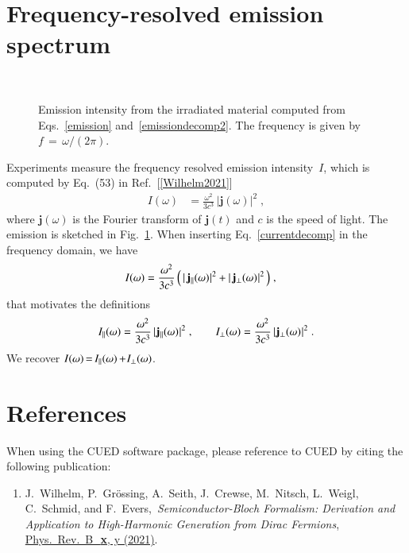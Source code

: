 \documentclass[11pt, a4paper]{scrartcl}
\newlength\figureheight
\newlength\figurewidth
\newcommand{\paper}[4]{\item #1, \,\textit{#2}, \,\href{#3}{#4}.\\[-1.4em]}
\newcommand{\bj}{\mathbf{j}}
\newcommand{\sd}{\hspace{0.05em}}
\newcommand{\eqt}{\,{=}\,}
\begin{document}
\section{Frequency-resolved emission spectrum}
\begin{figure}[b!]
\centering
\setlength\figureheight{9cm} 
\setlength{}

\\[1.5em]

\caption{Emission intensity from the irradiated material computed from Eqs.~\eqref{emission} and~\eqref{emissiondecomp2}.
%
The frequency is given by $f\eqt\omega/(2\pi)$.
}
    \label{fig:emission}
\end{figure}
Experiments measure the  frequency resolved emission intensity~$I$, which is computed by Eq.~(53) in Ref.~[\ref{Wilhelm2021}]
\begin{align}
I(\omega) &=
\frac{\omega^2}{3c^3}\,|\bj(\omega)|^2\;, \label{emission}
\end{align}
where $\bj(\omega)$ is the Fourier transform of $\bj(t)$ and $c$ is the speed of light. 
%
The emission is sketched in Fig.~\ref{fig:emission}.
%
When inserting Eq.~\eqref{currentdecomp} in the frequency domain, we have
\begin{align}
I(\omega) &=
\frac{\omega^2}{3c^3}\,\Big(\,|\,\bj_\parallel(\omega)\sd|^2
+ |\,\bj_\bot(\omega)\sd|^2 \,\Big)
\;, \label{emissiondecomp}
\end{align}
that motivates the definitions
\begin{align}
I_\parallel(\omega) =
\frac{\omega^2}{3c^3}\, |\sd\bj_\parallel(\omega)\sd|^2\;,
\hspace{2em}
I_\bot(\omega) =
\frac{\omega^2}{3c^3}\, |\sd\bj_\bot(\omega)\sd|^2\;. \label{emissiondecomp2}
\end{align}
We recover $I(\omega)\eqt I_\parallel(\omega)\,{+}\sd I_\bot(\omega)$.




\section{References}
When using the CUED software package, please reference to CUED by citing the following publication:
\begin{enumerate}[leftmargin=*]

\paper{J.~Wilhelm, P.~Grössing, A.~Seith, J.~Crewse, M.~Nitsch, L.~Weigl, C.~Schmid, and F.~Evers}{Semi\-con\-duc\-tor-Bloch Formalism: Derivation and Application to High-Harmonic Generation from Dirac Fermions}{TOBEFILLED}{ 
Phys.~Rev.~B~\,\textbf{x}, y (2021)}
\label{Wilhelm2021}

\end{enumerate}
\end{document}
